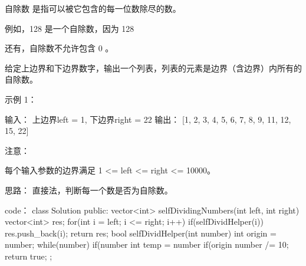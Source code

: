 自除数 是指可以被它包含的每一位数除尽的数。

例如，128 是一个自除数，因为 128 %

还有，自除数不允许包含 0 。

给定上边界和下边界数字，输出一个列表，列表的元素是边界（含边界）内所有的自除数。

示例 1：

输入： 
上边界left = 1, 下边界right = 22
输出： [1, 2, 3, 4, 5, 6, 7, 8, 9, 11, 12, 15, 22]

注意：

    每个输入参数的边界满足 1 <= left <= right <= 10000。























思路：
直接法，判断每一个数是否为自除数。






















code：
class Solution {
public:
    vector<int> selfDividingNumbers(int left, int right) {
        vector<int> res;
        for(int i = left; i <= right; i++)
        {
            if(selfDividHelper(i)) res.push_back(i);
        }
        return res;
    }
    bool selfDividHelper(int number)
    {
        int origin = number;
        while(number)
        {
            if(number %
            int temp = number %
            if(origin %
            number /= 10;
        }
        return true; 
    }
};